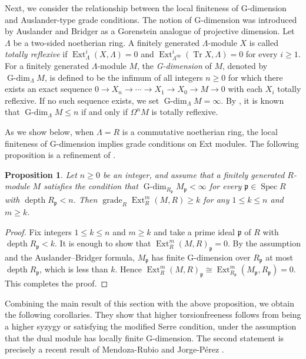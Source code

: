 \documentclass{amsart}
\newtheorem{prop}[thm]{Proposition}
\theoremstyle{definition}
\theoremstyle{remark}
\numberwithin{equation}{thm}
\def\depth{\operatorname{depth}}
\def\Ext{\operatorname{Ext}}
\def\Gdim{\operatorname{G-dim}}
\def\ge{\geqslant}
\def\grade{\operatorname{grade}}
\def\le{\leqslant}
\def\p{\mathfrak{p}}
\def\spec{\operatorname{Spec}}
\def\syz{\Omega}
\def\tr{\operatorname{Tr}}
\begin{document}
Next, we consider the relationship between the local finiteness of G-dimension and Auslander-type grade conditions.
The notion of G-dimension was introduced by Auslander and Bridger \cite{AB} as a Gorenstein analogue of projective dimension.
Let $\Lambda$ be a two-sided noetherian ring.
A finitely generated $\Lambda$-module $X$ is called \textit{totally reflexive} if $\Ext^i_\Lambda(X,\Lambda)=0$ and $\Ext^i_{\Lambda^{\mathrm{op}}}(\tr X,\Lambda)=0$ for every $i\ge1$.
For a finitely generated $\Lambda$-module $M$, the \textit{G-dimension} of $M$, denoted by $\Gdim_\Lambda M$, is defined to be the infimum of all integers $n\ge0$ for which there exists an exact sequence
$
0\to X_n\to\cdots\to X_1\to X_0\to M\to0
$
with each $X_i$ totally reflexive.
If no such sequence exists, we set $\Gdim_\Lambda M=\infty$.
By \cite[Theorem 3.13]{AB}, it is known that $\Gdim_\Lambda M\le n$ if and only if $\syz^n M$ is totally reflexive.

As we show below, when $\Lambda=R$ is a commutative noetherian ring, the local finiteness of G-dimension implies grade conditions on Ext modules.
The following proposition is a refinement of \cite[Proposition 4.16 and Corollary 4.17]{AB}.

\begin{prop}\label{Gdimgrd}
Let $n\ge0$ be an integer, and assume that a finitely generated $R$-module $M$ satisfies the condition that $\Gdim_{R_\p}M_\p<\infty$ for every $\p\in\spec R$ with $\depth R_\p<n$. Then $\grade_R\Ext^m_R(M,R)\ge k$ for any $1\le k\le n$ and $m\ge k$.
\end{prop}

\begin{proof}
Fix integers $1\le k\le n$ and $m\ge k$ and take a prime ideal $\p$ of $R$ with $\depth R_\p<k$. It is enough to show that $\Ext^m_R(M,R)_\p=0$.
By the assumption and the Auslander--Bridger formula, $M_\p$ has finite G-dimension over $R_\p$ at most $\depth R_\p$, which is less than $k$.
Hence $\Ext^m_R(M,R)_\p\cong\Ext^m_{R_\p}(M_\p,R_\p)=0$. This completes the proof.
\end{proof}

Combining the main result of this section with the above proposition, we obtain the following corollaries. They show that higher torsionfreeness follows from being a higher syzygy or satisfying the modified Serre condition, under the assumption that the dual module has locally finite G-dimension. The second statement is precisely a recent result of Mendoza-Rubio and Jorge-P\'erez \cite[Theorem 1.1]{MJ}.
\end{document}
